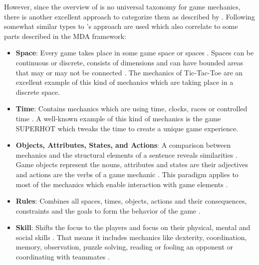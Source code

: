\documentclass[MGS,Master,english]{twbook}%
\begin{document}
However, since the overview of \citep{gameDesign::gameMechanicsAdvancedGameDesign} is no universal taxonomy for game mechanics, there is another excellent approach to categorize them as described by \cite{gameDesign::bookOfLenses}. Following somewhat similar types to 's approach are used which also correlate to some parts described in the MDA framework:
\begin{itemize}
	\item \textbf{Space}: Every game takes place in some game space or spaces \cite{gameDesign::bookOfLenses}. Spaces can be continuous or discrete, consists of dimensions and can have bounded areas that may or may not be connected \cite{gameDesign::bookOfLenses}. The mechanics of Tic-Tac-Toe are an excellent example of this kind of mechanics which are taking place in a discrete space. 
	\item \textbf{Time}: Contains mechanics which are using time, clocks, races or controlled time \cite{gameDesign::bookOfLenses}. A well-known example of this kind of mechanics is the game SUPERHOT \cite{game::superhot} which tweaks the time to create a unique game experience.
	\item \textbf{Objects, Attributes, States, and Actions}: A comparison between mechanics and the structural elements of a sentence reveals similarities \cite{gameDesign::bookOfLenses}. Game objects represent the nouns, attributes and states are their adjectives and actions are the verbs of a game mechanic \cite{gameDesign::bookOfLenses}. This paradigm applies to most of the mechanics which enable interaction with game elements \cite{gameDesign::bookOfLenses}. 
	\item \textbf{Rules}: Combines all spaces, times, objects, actions and their consequences, constraints and the goals to form the behavior of the game \cite{gameDesign::bookOfLenses}. 
	\item \textbf{Skill}: Shifts the focus to the players and focus on their physical, mental and social skills \cite{gameDesign::bookOfLenses}. That means it includes mechanics like dexterity, coordination, memory, observation, puzzle solving, reading or fooling an opponent or coordinating with teammates \cite{gameDesign::bookOfLenses}.  
\end{itemize}

\end{document}
